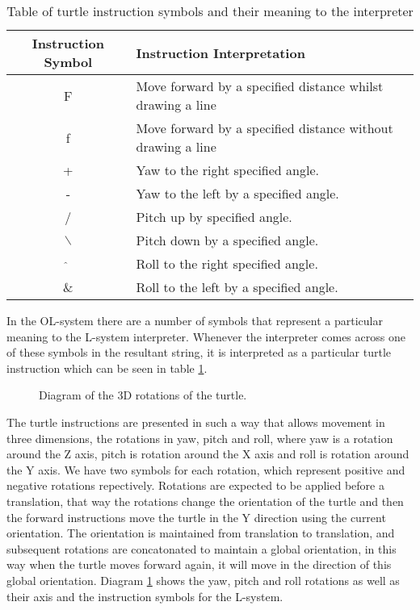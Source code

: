 \begin{flushleft}
\begin{table}[h!]
\begin{tabular}{ | c | l | }
\hline
	Instruction Symbol 	& Instruction Interpretation \\  
\hline
\hline
	F 					& Move forward by a specified distance whilst drawing a line\\
\hline
	f 					& Move forward by a specified distance without drawing a line\\
\hline
	+ 					& Yaw to the right specified angle.\\
\hline
	- 					& Yaw to the left by a specified angle.\\
\hline
	/ 					& Pitch up by specified angle. \\
\hline
	$\backslash$ 		& Pitch down by a specified angle.\\
\hline
	$\hat{}$ 			& Roll to the right specified angle.\\
\hline
	\& 					& Roll to the left by a specified angle.\\
\hline
\end{tabular}
\caption{Table of turtle instruction symbols and their meaning to the interpreter}
\label{instruction table 1}
\end{table}
\FloatBarrier

In the OL-system there are a number of symbols that represent a particular meaning to the L-system interpreter. Whenever the interpreter comes across one of these symbols in the resultant string, it is interpreted as a particular turtle instruction which can be seen in table \ref{instruction table 1}. 

\vspace{5mm}

\begin{figure}[htbp]
	{\centering
		\setlength{\fboxrule}{1pt}
		\vspace{7px}
		\caption{Diagram of the 3D rotations of the turtle.} \label{3D rotations}
	}
\end{figure}
\FloatBarrier

The turtle instructions are presented in such a way that allows movement in three dimensions, the rotations in yaw, pitch and roll, where yaw is a rotation around the Z axis, pitch is rotation around the X axis and roll is rotation around the Y axis. We have two symbols for each rotation, which represent positive and negative rotations repectively. Rotations are expected to be applied before a translation, that way the rotations change the orientation of the turtle and then the forward instructions move the turtle in the Y direction using the current orientation. The orientation is maintained from translation to translation, and subsequent rotations are concatonated to maintain a global orientation, in this way when the turtle moves forward again, it will move in the direction of this global orientation. Diagram  \ref{3D rotations} shows the yaw, pitch and roll rotations as well as their axis and the instruction symbols for the L-system. \\ 


\end{flushleft}
